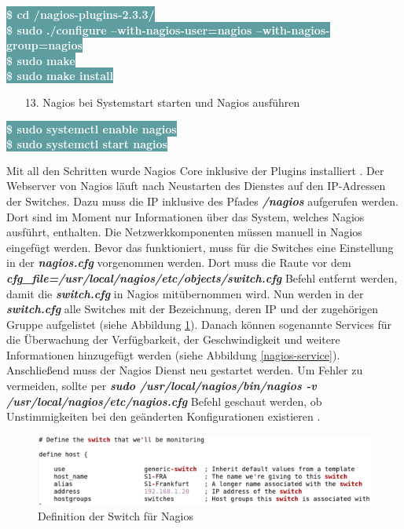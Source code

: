 \documentclass[fontsize=12pt,paper=a4,open=any,parskip=half,
  twoside=false,toc=listof,toc=bibliography,fleqn,leqno,
  captions=nooneline,captions=tableabove,british]{scrbook}
\begin{document}
\colorbox{CadetBlue}{\textcolor{white}{\textbf{\textsf{\$ cd /nagios-plugins-2.3.3/}}}}\\
\colorbox{CadetBlue}{\textcolor{white}{\textbf{\textsf{\$ sudo ./configure --with-nagios-user=nagios --with-nagios-group=nagios}}}}\\
\colorbox{CadetBlue}{\textcolor{white}{\textbf{\textsf{\$ sudo make}}}}\\
\colorbox{CadetBlue}{\textcolor{white}{\textbf{\textsf{\$ sudo make install}}}}
\newpage
\begin{itemize}
\item[13.] Nagios bei Systemstart starten und Nagios ausführen
\end{itemize}
\colorbox{CadetBlue}{\textcolor{white}{\textbf{\textsf{\$ sudo systemctl enable nagios}}}}\\
\colorbox{CadetBlue}{\textcolor{white}{\textbf{\textsf{\$ sudo systemctl start nagios}}}}


Mit all den Schritten wurde Nagios Core inklusive der Plugins installiert \cite{nagiosinstall}. Der Webserver von Nagios läuft nach Neustarten des Dienstes auf den IP-Adressen der Switches. Dazu muss die IP inklusive des Pfades \textit{\textbf{/nagios}} aufgerufen werden. Dort sind im Moment nur Informationen über das System, welches Nagios ausführt, enthalten. Die Netzwerkkomponenten müssen manuell in Nagios eingefügt werden. Bevor das funktioniert, muss für die Switches eine Einstellung in der \textit{\textbf{nagios.cfg}} vorgenommen werden. Dort muss die Raute vor dem \textit{\textbf{cfg\_file=/usr/local/nagios/etc/objects/switch.cfg}} Befehl entfernt werden, damit die \textit{\textbf{switch.cfg}} in Nagios mitübernommen wird. Nun werden in der \textit{\textbf{switch.cfg}} alle Switches mit der Bezeichnung, deren IP und der zugehörigen Gruppe aufgelistet (siehe Abbildung \ref{nagios-switch}). Danach können sogenannte Services für die Überwachung der Verfügbarkeit, der Geschwindigkeit und weitere Informationen hinzugefügt werden (siehe Abbildung \ref{nagios-service}). Anschließend muss der Nagios Dienst neu gestartet werden. Um Fehler zu vermeiden, sollte per \textit{\textbf{sudo /usr/local/nagios/bin/nagios -v /usr/local/nagios/etc/nagios.cfg}} Befehl geschaut werden, ob Unstimmigkeiten bei den geänderten Konfigurationen existieren \cite{nagiosrouter}.\par

\begin{figure}[H]
 \centering
 \includegraphics[width=1.0\textwidth]{Bilder/nagios-switch}
 \captionsetup{justification=centering, margin=2cm}
 \caption{Definition der Switch für Nagios}
 \label{nagios-switch}
\end{figure}
\end{document}
